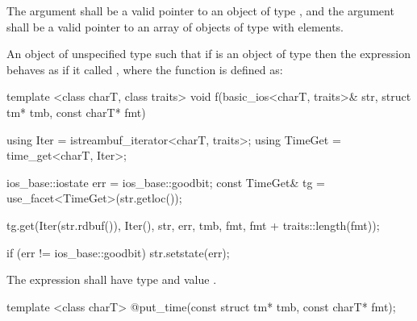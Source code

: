 \begin{itemdescr}
\pnum
\requires The argument  shall be a valid pointer to an object of type , and the argument  shall be a valid pointer to an array of objects of type  with  elements.

\pnum
\returns An object of unspecified type such that if  is an object of type
 then the expression  behaves as if it called , where the function  is
defined as:

\begin{codeblock}
template <class charT, class traits>
void f(basic_ios<charT, traits>& str, struct tm* tmb, const charT* fmt) {
  using Iter    = istreambuf_iterator<charT, traits>;
  using TimeGet = time_get<charT, Iter>;

  ios_base::iostate err = ios_base::goodbit;
  const TimeGet& tg = use_facet<TimeGet>(str.getloc());

  tg.get(Iter(str.rdbuf()), Iter(), str, err, tmb,
    fmt, fmt + traits::length(fmt));

  if (err != ios_base::goodbit)
    str.setstate(err);
}
\end{codeblock}

The expression  shall have type
 and value .
\end{itemdescr}

%
\begin{itemdecl}
template <class charT> @\unspec@ put_time(const struct tm* tmb, const charT* fmt);
\end{itemdecl}


